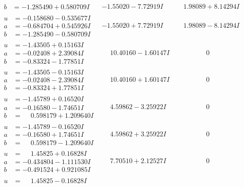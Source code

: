 \documentclass[1p]{elsarticle_modified}
\theoremstyle{definition}
\begin{document}
$$\begin{array}{c|c|c}
\begin{aligned}
b &= -1.285490 + 0.580709 I\end{aligned}
 & -1.55020 - 7.72919 I & \phantom{-}1.98089 + 8.14294 I \\ \hline\begin{aligned}
u &= -0.158680 - 0.535677 I \\
a &= -0.684704 + 0.545926 I \\
b &= -1.285490 - 0.580709 I\end{aligned}
 & -1.55020 + 7.72919 I & \phantom{-}1.98089 - 8.14294 I \\ \hline\begin{aligned}
u &= -1.43505 + 0.15163 I \\
a &= -0.02408 + 2.39084 I \\
b &= -0.83324 - 1.77851 I\end{aligned}
 & \phantom{-}10.40160 - 1.60147 I & \phantom{-0.000000 } 0 \\ \hline\begin{aligned}
u &= -1.43505 - 0.15163 I \\
a &= -0.02408 - 2.39084 I \\
b &= -0.83324 + 1.77851 I\end{aligned}
 & \phantom{-}10.40160 + 1.60147 I & \phantom{-0.000000 } 0 \\ \hline\begin{aligned}
u &= -1.45789 + 0.16520 I \\
a &= -0.16580 - 1.74651 I \\
b &= \phantom{-}0.598179 + 1.209640 I\end{aligned}
 & \phantom{-}4.59862 - 3.25922 I & \phantom{-0.000000 } 0 \\ \hline\begin{aligned}
u &= -1.45789 - 0.16520 I \\
a &= -0.16580 + 1.74651 I \\
b &= \phantom{-}0.598179 - 1.209640 I\end{aligned}
 & \phantom{-}4.59862 + 3.25922 I & \phantom{-0.000000 } 0 \\ \hline\begin{aligned}
u &= \phantom{-}1.45825 + 0.16828 I \\
a &= -0.434804 - 1.111530 I \\
b &= -0.491524 + 0.921085 I\end{aligned}
 & \phantom{-}7.70510 + 2.12527 I & \phantom{-0.000000 } 0 \\ \hline\begin{aligned}
u &= \phantom{-}1.45825 - 0.16828 I \\

\end{aligned}
\end{array}$$
\end{document}
